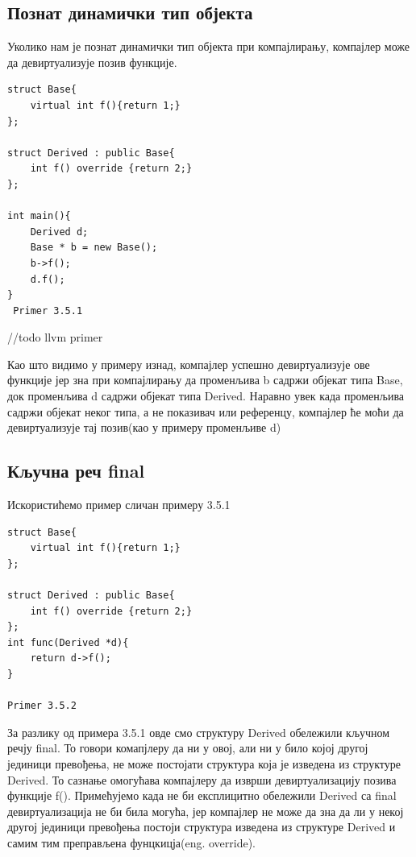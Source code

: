 \documentclass[12pt,oneside]{memoir}
\begin{document}
 \subsection{Познат динамички тип објекта}
 Уколико нам је познат динамички тип објекта при компајлирању, компајлер може 
 да девиртуализује позив функције.
 
 \begin{lstlisting}
struct Base{
    virtual int f(){return 1;}
};

struct Derived : public Base{
    int f() override {return 2;}
};

int main(){
    Derived d;
    Base * b = new Base();
    b->f();
    d.f();  
}
 Primer 3.5.1
 \end{lstlisting}

 //todo llvm primer
 
 Као што видимо у примеру изнад, компајлер успешно девиртуализује ове функције
 јер зна при компајлирању да променљива b садржи објекат типа Base, док променљива
 d садржи објекат типа Derived.
 Наравно увек када променљива садржи објекат неког типа, а не показивач или референцу,
 компајлер ће моћи да девиртуализује тај позив(као у примеру променљиве d)
 
 \subsection{Кључна реч final}
 
 Искористићемо пример сличан примеру 3.5.1
 
\begin{lstlisting}
struct Base{
    virtual int f(){return 1;}
};

struct Derived : public Base{
    int f() override {return 2;}
};
int func(Derived *d){
    return d->f();
}

Primer 3.5.2
\end{lstlisting}
 
 За разлику од примера 3.5.1 овде смо структуру Derived обележили кључном 
 речју final.
 То говори комапјлеру да ни у овој, али ни у било којој другој јединици превођења, 
 не може постојати структура која је изведена из структуре Derived.
 То сазнање омогућава компајлеру да изврши девиртуализацију позива функције f().
 Примећујемо када не би експлицитно обележили  Derived са final девиртуализација
 не би била могућа, јер компајлер не може да зна да ли у некој другој јединици превођења
 постоји структура изведена из структуре Derived и самим тим преправљена фунцкицја(eng. override).
 
\end{document}
